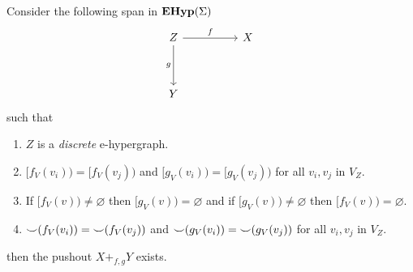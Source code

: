 \begin{theorem}
	\label{th:existence_of_pushouts}
	Consider the following span in $\mathbf{EHyp}(\Sigma)$
	\[\begin{tikzcd}
			Z && X \\
			\\
			Y
			\arrow["f", from=1-1, to=1-3]
			\arrow["g"', from=1-1, to=3-1]
		\end{tikzcd}\]
	such that
	\begin{enumerate}
		\label{pushout:assumptions}
		\item $Z$ is a \textit{discrete} e-hypergraph.
		\item \label{assumption:equal_predecessors} $[f_{V}(v_i)) = [f_{V}(v_j))$ and $[g_{V}(v_i)) = [g_{V}(v_j))$ for all $v_{i},v_{j}$ in $V_{Z}$.
		\item \label{assumption:non_ambiguous_predecessors} If $[f_{V}(v)) \not = \varnothing$ then $[g_{V}(v)) = \varnothing$ and if $[g_{V}(v)) \not = \varnothing$ then $[f_{V}(v)) = \varnothing$.
		\item ${\smile}(f_{V}(v_i)) = {\smile}(f_{V}(v_j))$ and ${\smile}(g_{V}(v_i)) = {\smile}(g_{V}(v_j))$ for all $v_i,v_j$ in $V_{Z}$.
	\end{enumerate}
	then the pushout $X +_{f,g} Y$ exists.
\end{theorem}
